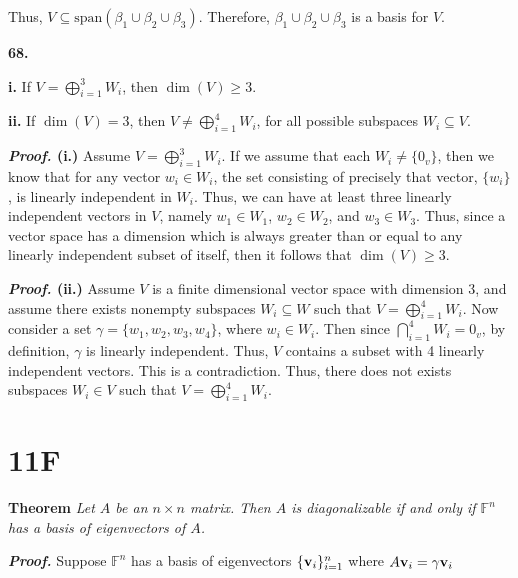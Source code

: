 \documentclass[12pt, a4paper]{article}
\begin{document}
\vspace{4mm}

\noindent Thus, $V\subseteq\text{span}(\beta_1\cup\beta_2\cup\beta_3)$. Therefore, $\beta_1\cup\beta_2\cup\beta_3$ is a basis for $V$. \square

\vspace{6mm}

\noindent\textbf{68.}

\begin{description}
    \item\textbf{i. } If $V=\bigoplus_{i=1}^3 W_i$, then $\dim(V)\geq 3$.
    \item\textbf{ii.} If $\dim(V)=3$, then $V\neq\bigoplus_{i=1}^4 W_i$, for all possible subspaces $W_i\subseteq V$.
\end{description}

\vspace{4mm}\par

\textbf{\textit{Proof.} (i.)} Assume $V=\bigoplus_{i=1}^3 W_i$. If we assume that each $W_i\neq \{0_v\}$, then we know that for any vector $w_i\in W_i$, the set consisting of precisely that vector, $\{w_i\}$, is linearly independent in $W_i$. Thus, we can have at least three linearly independent vectors in $V$, namely $w_1\in W_1$, $w_2\in W_2$, and $w_3\in W_3$. Thus, since a vector space has a dimension which is always greater than or equal to any linearly independent subset of itself, then it follows that $\dim(V)\geq 3$. \square

\vspace{4mm}\par

\textbf{\textit{Proof.} (ii.)} Assume $V$ is a finite dimensional vector space with dimension $3$, and assume there exists nonempty subspaces $W_i\subseteq W$ such that $V=\bigoplus_{i=1}^4 W_i$. Now consider a set $\gamma=\{w_1,w_2,w_3,w_4\}$, where $w_i\in W_i$. Then since $\bigcap_{i=1}^4 W_i=0_v$, by definition, $\gamma$ is linearly independent. Thus, $V$ contains a subset with 4 linearly independent vectors. This is a contradiction. Thus, there does not exists subspaces $W_i\in V$ such that $V=\bigoplus_{i=1}^4 W_i$. \square

\newpage

\section{11F}

\newpage

\noindent\textbf{Theorem} \textit{Let $A$ be an $n\times n$ matrix. Then $A$ is diagonalizable if and only if $\mathbb{F}^n$ has a basis of eigenvectors of $A$.}

\vspace{4mm}

\textbf{\textit{Proof.}} Suppose $\mathbb{F}^n$ has a basis of eigenvectors $\{\bold{v}_i\}_{i=1}^n$ where $A\bold{v}_i=\gamma\bold{v}_i$
\end{document}
